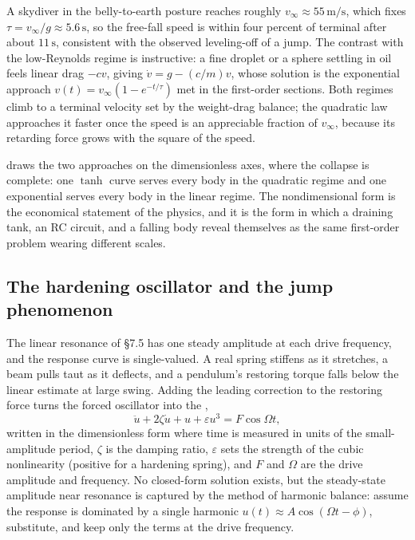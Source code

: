 A skydiver in the belly-to-earth posture reaches roughly
$v_{\infty} \approx 55\,\si{\meter\per\second}$, which fixes
$\tau = v_{\infty}/g \approx 5.6\,\si{\second}$, so the free-fall
speed is within four percent of terminal after about
$11\,\si{\second}$, consistent with the observed leveling-off of a
jump. The contrast with the low-Reynolds regime is instructive: a fine
droplet or a sphere settling in oil feels linear drag $-c v$, giving
$\dot{v} = g - (c/m) v$, whose solution is the exponential approach
$v(t) = v_{\infty}(1 - e^{-t/\tau})$ met in the first-order sections.
Both regimes climb to a terminal velocity set by the weight-drag
balance; the quadratic law approaches it faster once the speed is an
appreciable fraction of $v_{\infty}$, because its retarding force grows
with the square of the speed.



 draws the two approaches on the
dimensionless axes, where the collapse is complete: one $\tanh$ curve
serves every body in the quadratic regime and one exponential serves
every body in the linear regime. The nondimensional form is the
economical statement of the physics, and it is the form in which a
draining tank, an RC circuit, and a falling body reveal themselves as
the same first-order problem wearing different scales.

\subsection{The hardening oscillator and the jump phenomenon}

The linear resonance of \S7.5 has one steady amplitude at each drive
frequency, and the response curve is single-valued. A real spring
stiffens as it stretches, a beam pulls taut as it deflects, and a
pendulum's restoring torque falls below the linear estimate at large
swing. Adding the leading correction to the restoring force turns the
forced oscillator into the ,
\[
\ddot{u} + 2\zeta \dot{u} + u + \varepsilon u^{3} = F \cos \Omega t,
\]
written in the dimensionless form where time is measured in units of
the small-amplitude period, $\zeta$ is the damping ratio, $\varepsilon$
sets the strength of the cubic nonlinearity (positive for a hardening
spring), and $F$ and $\Omega$ are the drive amplitude and frequency. No
closed-form solution exists, but the steady-state amplitude near
resonance is captured by the method of harmonic balance: assume the
response is dominated by a single harmonic $u(t) \approx A \cos(\Omega t
- \phi)$, substitute, and keep only the terms at the drive frequency.

